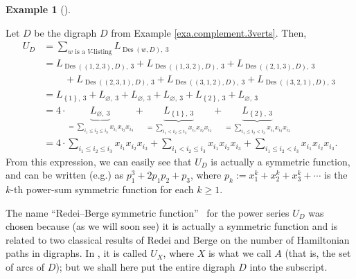 \documentclass[numbers=enddot,12pt,final,onecolumn,notitlepage]{scrartcl}%
\numberwithin{exer}{section}
\theoremstyle{definition}
\newtheorem{exam}[theo]{Example}
\newenvironment{example}[1][]
{\begin{exam}[#1]\begin{leftbar}}
{\end{leftbar}\end{exam}}
\let\sumnonlimits\sum
\renewcommand{\sum}{\sumnonlimits\limits}
\begin{document}
\begin{example}
\label{exa.UD.1}Let $D$ be the digraph $D$ from Example
\ref{exa.complement.3verts}. Then,%
\begin{align*}
U_{D}  &  =\sum_{w\text{ is a }V\text{-listing}}L_{\operatorname*{Des}\left(
w,D\right)  ,\ 3}\\
&  =L_{\operatorname*{Des}\left(  \left(  1,2,3\right)  ,D\right)
,\ 3}+L_{\operatorname*{Des}\left(  \left(  1,3,2\right)  ,D\right)
,\ 3}+L_{\operatorname*{Des}\left(  \left(  2,1,3\right)  ,D\right)  ,\ 3}\\
&  \ \ \ \ \ \ \ \ \ \ +L_{\operatorname*{Des}\left(  \left(  2,3,1\right)
,D\right)  ,\ 3}+L_{\operatorname*{Des}\left(  \left(  3,1,2\right)
,D\right)  ,\ 3}+L_{\operatorname*{Des}\left(  \left(  3,2,1\right)
,D\right)  ,\ 3}\\
&  =L_{\left\{  1\right\}  ,\ 3}+L_{\varnothing,\ 3}+L_{\varnothing
,\ 3}+L_{\varnothing,\ 3}+L_{\left\{  2\right\}  ,\ 3}+L_{\varnothing,\ 3}\\
&  =4\cdot\underbrace{L_{\varnothing,\ 3}}_{=\sum_{i_{1}\leq i_{2}\leq i_{3}%
}x_{i_{1}}x_{i_{2}}x_{i_{3}}}+\underbrace{L_{\left\{  1\right\}  ,\ 3}}%
_{=\sum_{i_{1}<i_{2}\leq i_{3}}x_{i_{1}}x_{i_{2}}x_{i_{3}}}%
+\underbrace{L_{\left\{  2\right\}  ,\ 3}}_{=\sum_{i_{1}\leq i_{2}<i_{3}%
}x_{i_{1}}x_{i_{2}}x_{i_{3}}}\\
&  =4\cdot\sum_{i_{1}\leq i_{2}\leq i_{3}}x_{i_{1}}x_{i_{2}}x_{i_{3}}%
+\sum_{i_{1}<i_{2}\leq i_{3}}x_{i_{1}}x_{i_{2}}x_{i_{3}}+\sum_{i_{1}\leq
i_{2}<i_{3}}x_{i_{1}}x_{i_{2}}x_{i_{3}}.
\end{align*}
From this expression, we can easily see that $U_{D}$ is actually a symmetric
function, and can be written (e.g.) as $p_{1}^{3}+2p_{1}p_{2}+p_{3}$, where
$p_{k}:=x_{1}^{k}+x_{2}^{k}+x_{3}^{k}+\cdots$ is the $k$-th power-sum
symmetric function for each $k\geq1$.
\end{example}

The name \textquotedblleft Redei--Berge symmetric function\textquotedblright%
\ for the power series $U_{D}$ was chosen because (as we will soon see) it is
actually a symmetric function and is related to two classical results of Redei
and Berge on the number of Hamiltonian paths in digraphs. In \cite[Problem
120]{EC2supp}, it is called $U_{X}$, where $X$ is what we call $A$ (that is,
the set of arcs of $D$); but we shall here put the entire digraph $D$ into the subscript.
\end{document}
